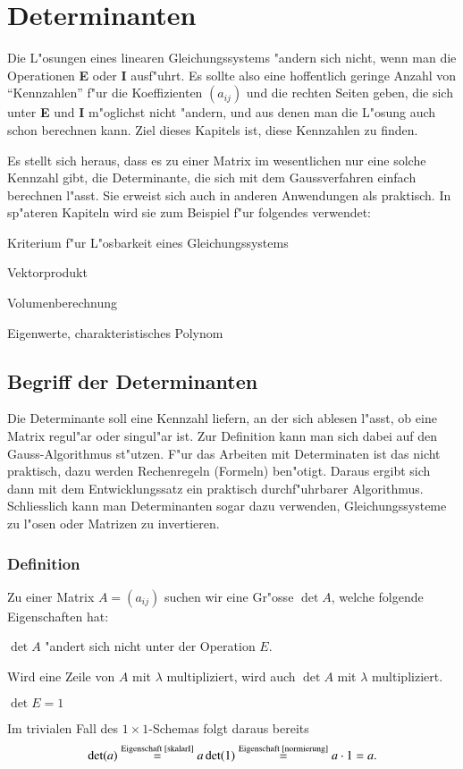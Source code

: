 \chapter{Determinanten\label{chapter-determinanten}}
Die L"osungen eines linearen Gleichungssystems "andern sich nicht,
wenn man die Operationen {\bf E} oder {\bf I} ausf"uhrt. Es sollte
also eine hoffentlich geringe Anzahl von ``Kennzahlen'' f"ur die
Koeffizienten $(a_{ij})$
und die rechten Seiten geben, die sich unter {\bf E} und {\bf I}
m"oglichst nicht "andern, und aus denen man die L"osung auch
schon berechnen kann. Ziel dieses Kapitels ist, diese Kennzahlen
zu finden.

Es stellt sich heraus, dass es zu einer Matrix
im wesentlichen nur eine solche Kennzahl gibt, die Determinante,
die sich mit dem Gaussverfahren einfach berechnen l"asst. Sie erweist
sich auch in anderen Anwendungen als praktisch. In sp"ateren Kapiteln
wird sie zum Beispiel f"ur folgendes verwendet:
\begin{compactitem}
\item Kriterium f"ur L"osbarkeit eines Gleichungssystems
\item Vektorprodukt
\item Volumenberechnung
\item Eigenwerte, charakteristisches Polynom
\end{compactitem}
\section{Begriff der Determinanten}
Die Determinante soll eine Kennzahl liefern, an der sich ablesen
l"asst, ob eine Matrix regul"ar oder singul"ar ist. Zur Definition
kann man sich dabei auf den Gauss-Algorithmus st"utzen. F"ur das
Arbeiten mit Determinaten ist das nicht praktisch, dazu werden
Rechenregeln (Formeln) ben"otigt. Daraus ergibt sich dann mit
dem Entwicklungssatz ein praktisch durchf"uhrbarer Algorithmus.
Schliesslich kann man Determinanten sogar dazu verwenden, Gleichungssysteme
zu l"osen oder Matrizen zu invertieren.
\subsection{Definition}
Zu einer Matrix $A=(a_{ij})$ suchen wir eine Gr"osse
$\det A$, welche folgende Eigenschaften hat:
\begin{compactenum}
\item $\det A$ "andert sich nicht unter der Operation $E$.\label{invarianzE}
\item Wird eine Zeile von $A$ mit $\lambda$ multipliziert,\label{skalarI}
wird auch $\det A$ mit $\lambda$ multipliziert.
\item $\det E=1$\label{normierung}
\end{compactenum}
Im trivialen Fall des $1\times1$-Schemas folgt daraus bereits
\[
\det(a)\overset{\text{Eigenschaft \ref{skalarI}}}=a\det(1)\overset{\text{Eigenschaft \ref{normierung}}}=a\cdot 1=a.
\]

